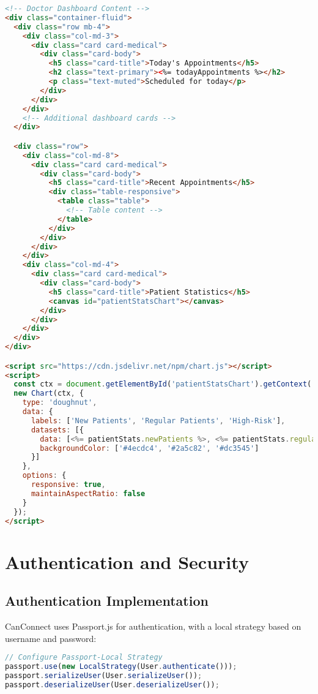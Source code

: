 \documentclass[12pt,a4paper]{report}
\begin{document}
\begin{lstlisting}[language=HTML]
<!-- Doctor Dashboard Content -->
<div class="container-fluid">
  <div class="row mb-4">
    <div class="col-md-3">
      <div class="card card-medical">
        <div class="card-body">
          <h5 class="card-title">Today's Appointments</h5>
          <h2 class="text-primary"><%= todayAppointments %></h2>
          <p class="text-muted">Scheduled for today</p>
        </div>
      </div>
    </div>
    <!-- Additional dashboard cards -->
  </div>

  <div class="row">
    <div class="col-md-8">
      <div class="card card-medical">
        <div class="card-body">
          <h5 class="card-title">Recent Appointments</h5>
          <div class="table-responsive">
            <table class="table">
              <!-- Table content -->
            </table>
          </div>
        </div>
      </div>
    </div>
    <div class="col-md-4">
      <div class="card card-medical">
        <div class="card-body">
          <h5 class="card-title">Patient Statistics</h5>
          <canvas id="patientStatsChart"></canvas>
        </div>
      </div>
    </div>
  </div>
</div>

<script src="https://cdn.jsdelivr.net/npm/chart.js"></script>
<script>
  const ctx = document.getElementById('patientStatsChart').getContext('2d');
  new Chart(ctx, {
    type: 'doughnut',
    data: {
      labels: ['New Patients', 'Regular Patients', 'High-Risk'],
      datasets: [{
        data: [<%= patientStats.newPatients %>, <%= patientStats.regularPatients %>, <%= patientStats.highRisk %>],
        backgroundColor: ['#4ecdc4', '#2a5c82', '#dc3545']
      }]
    },
    options: {
      responsive: true,
      maintainAspectRatio: false
    }
  });
</script>
\end{lstlisting}

\chapter{Authentication and Security}

\section{Authentication Implementation}
CanConnect uses Passport.js for authentication, with a local strategy based on username and password:

\begin{lstlisting}[language=JavaScript]
// Configure Passport-Local Strategy
passport.use(new LocalStrategy(User.authenticate()));
passport.serializeUser(User.serializeUser());
passport.deserializeUser(User.deserializeUser());
\end{lstlisting}
\end{document}

